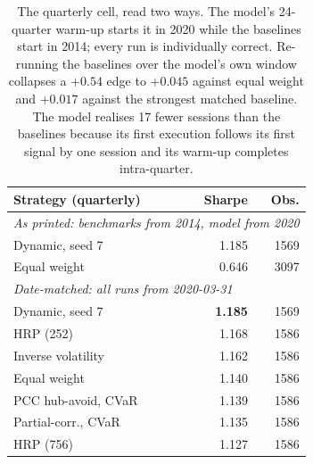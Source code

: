 \begin{table}[t]
\centering
\caption{The quarterly cell, read two ways. The model's 24-quarter warm-up starts it
in 2020 while the baselines start in 2014; every run is individually correct.
Re-running the baselines over the model's own window collapses a $+0.54$ edge to
$+0.045$ against equal weight and $+0.017$ against the strongest matched baseline.
The model realises 17 fewer sessions than the baselines because its first execution
follows its first signal by one session and its warm-up completes intra-quarter.}
\label{tab:period}
\footnotesize
\begin{tabular}{lrr}
\toprule
Strategy (quarterly) & Sharpe & Obs. \\
\midrule
\multicolumn{3}{l}{\emph{As printed: benchmarks from 2014, model from 2020}} \\
\quad Dynamic, seed 7 & 1.185 & 1569 \\
\quad Equal weight & 0.646 & 3097 \\
\midrule
\multicolumn{3}{l}{\emph{Date-matched: all runs from 2020-03-31}} \\
\quad Dynamic, seed 7 & \textbf{1.185} & 1569 \\
\quad HRP (252) & 1.168 & 1586 \\
\quad Inverse volatility & 1.162 & 1586 \\
\quad Equal weight & 1.140 & 1586 \\
\quad PCC hub-avoid, CVaR & 1.139 & 1586 \\
\quad Partial-corr., CVaR & 1.135 & 1586 \\
\quad HRP (756) & 1.127 & 1586 \\
\bottomrule
\end{tabular}
\end{table}
